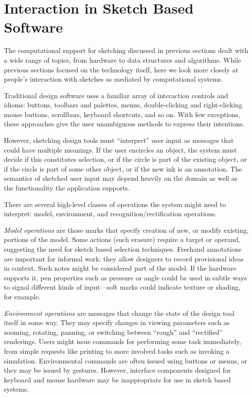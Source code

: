\newpage
\chapter{Interaction in Sketch Based Software}
\label{sec:interaction}

The computational support for sketching discussed in previous sections
dealt with a wide range of topics, from hardware to data structures
and algorithms. While previous sections focused on the technology
itself, here we look more closely at people's interaction with
sketches as mediated by computational systems.

Traditional design software uses a familiar array of interaction
controls and idioms: buttons, toolbars and palettes, menus,
double-clicking and right-clicking mouse buttons, scrollbars, keyboard
shortcuts, and so on. With few exceptions, these approaches give the
user unambiguous methods to express their intentions.

However, sketching design tools must ``interpret'' user input as
messages that could have multiple meanings. If the user encircles an
object, the system must decide if this constitutes selection, or if
the circle is part of the existing object, or if the circle is part of
some other object, or if the new ink is an annotation. The semantics
of sketched user input may depend heavily on the domain as well as the
functionality the application supports.

There are several high-level classes of operations the system might
need to interpret: model, environment, and recognition/rectification
operations.

\textit{Model operations} are those marks that specify creation of new,
or modify existing, portions of the model. Some actions (such erasure)
require a target or operand, suggesting the need for sketch based
selection techniques. Freehand annotations are important for informal
work: they allow designers to record provisional ideas in
context. Such notes might be considered part of the model. If the
hardware supports it, pen properties such as pressure or angle could
be used in subtle ways to signal different kinds of input---soft marks
could indicate texture or shading, for example.

\textit{Environment operations} are messages that change the state of
the design tool itself in some way. They may specify changes in
viewing parameters such as zooming, rotating, panning, or switching
between ``rough'' and ``rectified'' renderings. Users might issue
commands for performing some task immediately, from simple requests
like printing to more involved tasks such as invoking a
simulation. Environmental commands are often issued using buttons or
menus, or they may be issued by gestures. However, interface
components designed for keyboard and mouse hardware may be
inappropriate for use in sketch based systems.

